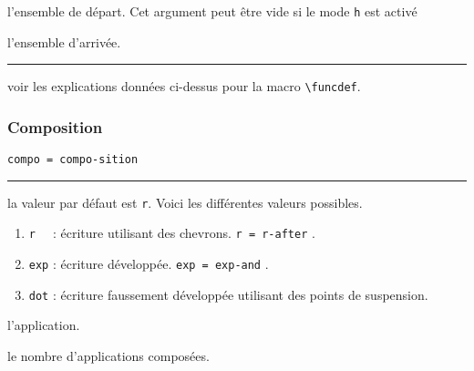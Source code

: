 \documentclass[12pt,a4paper]{article}
\newcommand\env[1]{\texttt{#1}}
\newcommand\macro[1]{\env{\textbackslash{}#1}}
\theoremstyle{definition}
\newcommand\separation{
	\medskip
	\hfill\rule{0.5\textwidth}{0.75pt}\hfill
	\medskip
}
\newcommand\extraspace{
	\vspace{0.25em}
}
\newcommand\mwhyprefix[2]{%
	\texttt{#1 = #1-#2}%
}
\begin{document}
 l'ensemble de départ. Cet argument peut être vide si le mode \verb+h+ est activé

 l'ensemble d'arrivée.


\separation




 voir les explications données ci-dessus pour la macro \macro{funcdef}.


\subsubsection{Composition}



  \hfill \mwhyprefix{compo}{sition}


\separation


\IDoption{} la valeur par défaut est \verb+r+. 
            Voici les différentes valeurs possibles.
\begin{enumerate}
	\item \verb+r  + : écriture utilisant des chevrons.  \hfill \mwhyprefix{r}{after}.

	\extraspace 
	
	\item \verb+exp+ : écriture développée.  \hfill \mwhyprefix{exp}{and}.

	\item \verb+dot+ : écriture faussement développée utilisant des points de suspension.
\end{enumerate}

 l'application.

 le nombre d'applications composées.
\end{document}

